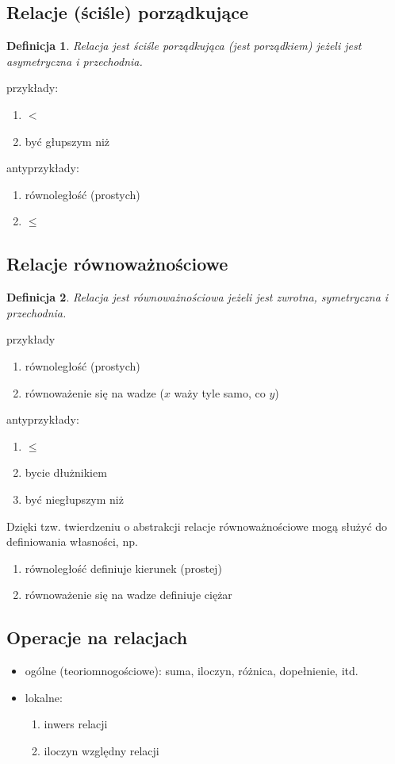 \documentclass[12pt]{article}
\newtheorem{definicja}{Definicja}
\begin{document}
\subsection{Relacje (ściśle) porządkujące}
%
\begin{definicja}
Relacja jest ściśle porządkująca (jest porządkiem) jeżeli jest asymetryczna i przechodnia.
\end{definicja}
%
przykłady:
\begin{enumerate}
\item $<$
\item być głupszym niż
\end{enumerate}
%
antyprzykłady:
\begin{enumerate}
\item równoległość (prostych)
\item $\leq$
\end{enumerate}
%

\subsection{Relacje równoważnościowe}
%
\begin{definicja}
Relacja jest równoważnościowa jeżeli jest zwrotna, symetryczna i przechodnia.
\end{definicja}
%
przykłady
\begin{enumerate}
\item równoległość (prostych)
\item równoważenie się na wadze ($x$ waży tyle samo, co $y$)
\end{enumerate}
%
antyprzykłady:
\begin{enumerate}
\item $\leq$
\item bycie dłużnikiem
\item być niegłupszym niż
\end{enumerate}
%
Dzięki tzw. twierdzeniu o abstrakcji relacje równoważnościowe mogą służyć do definiowania własności, np.
\begin{enumerate}
\item równoległość definiuje kierunek (prostej)
\item równoważenie się na wadze definiuje ciężar
\end{enumerate}
%

\subsection{Operacje na relacjach}
%
\begin{itemize}
	\item ogólne (teoriomnogościowe): suma, iloczyn, różnica, dopełnienie, itd.
	\item lokalne:
	\begin{enumerate}
		\item inwers relacji
		\item iloczyn względny relacji
	\end{enumerate}
\end{itemize}
%
\end{document}
